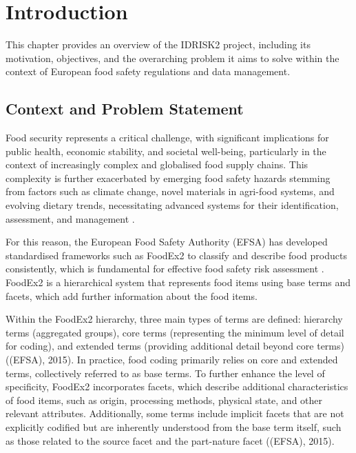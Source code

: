 \hypertarget{introduction}{%
\chapter{Introduction}\label{introduction}}

This chapter provides an overview of the IDRISK2 project, including its motivation, objectives, and the overarching problem it aims to solve within the context of European food safety regulations and data management.

\hypertarget{context-and-problem-statement}{%
\section{Context and Problem Statement}\label{context-and-problem-statement}}

Food security represents a critical challenge, with significant implications for public health, economic stability, and societal well-being, particularly in the context of increasingly complex and globalised food supply chains. This complexity is further exacerbated by emerging food safety hazards stemming from factors such as climate change, novel materials in agri-food systems, and evolving dietary trends, necessitating advanced systems for their identification, assessment, and management \parencite{john_f__leslie_d22f2c65}.

For this reason, the European Food Safety Authority (EFSA) has developed standardised frameworks such as FoodEx2 to classify and describe food products consistently, which is fundamental for effective food safety risk assessment \parencite{hern_n_g__redondo_919f3cec}. FoodEx2 is a hierarchical system that represents food items using base terms and facets, which add further information about the food items.

Within the FoodEx2 hierarchy, three main types of terms are defined: hierarchy terms (aggregated groups), core terms (representing the minimum level of detail for coding), and extended terms (providing additional detail beyond core terms) ((EFSA), 2015). In practice, food coding primarily relies on core and extended terms, collectively referred to as base terms. To further enhance the level of specificity, FoodEx2 incorporates facets, which describe additional characteristics of food items, such as origin, processing methods, physical state, and other relevant attributes. Additionally, some terms include implicit facets that are not explicitly codified but are inherently understood from the base term itself, such as those related to the source facet and the part-nature facet ((EFSA), 2015).

